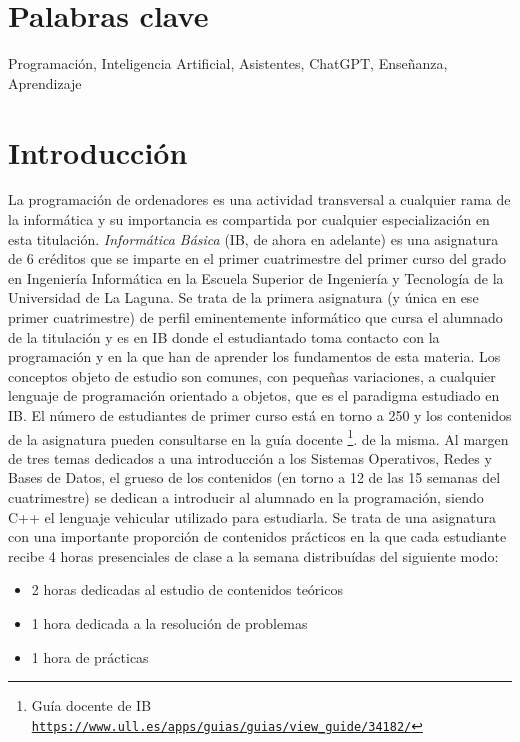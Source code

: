 \documentclass[twocolumn,twoside,a4paper, 10pt]{article}
\begin{document}
\section*{Palabras clave}
\noindent Programación, Inteligencia Artificial, Asistentes, ChatGPT, Enseñanza, Aprendizaje

\section{Introducción}
La programación de ordenadores es una actividad transversal a cualquier rama de la informática y su
importancia es compartida por cualquier especialización en esta titulación.
\textit{Informática Básica} 
(IB, de ahora en adelante) 
es una asignatura de 6 créditos que se imparte en el primer cuatrimestre 
del primer curso del grado en Ingeniería Informática en la Escuela Superior de Ingeniería y Tecnología de la Universidad de La Laguna.
Se trata de la primera asignatura (y única en ese primer cuatrimestre) de perfil eminentemente informático que
cursa el alumnado de la titulación y es en IB donde el estudiantado toma
contacto con la programación y en la que han de aprender los fundamentos de esta materia.
Los conceptos objeto de estudio son comunes, con pequeñas variaciones, a cualquier lenguaje de programación
orientado a objetos, que es el paradigma estudiado en IB.
El número de estudiantes de primer curso está en torno a 250 y los contenidos de la asignatura pueden 
consultarse en la guía docente
\footnote{Guía docente de IB\\ \href{https://www.ull.es/apps/guias/guias/view_guide/34182/}{\scriptsize{\texttt{https://www.ull.es/apps/guias/guias/view\_guide/34182/}}}}.
de la misma.
Al margen de tres temas dedicados a una introducción a los Sistemas Operativos, Redes y Bases de Datos,
el grueso de los contenidos (en torno a 12 de las 15 semanas del cuatrimestre) se dedican a introducir al
alumnado en la programación, siendo C++ el lenguaje vehicular utilizado para estudiarla.
Se trata de una asignatura con una importante proporción de contenidos prácticos en la que cada estudiante
recibe 4 horas presenciales de clase a la semana distribuídas del siguiente modo:
\begin{itemize}
  \item 2 horas dedicadas al estudio de contenidos teóricos
  \item 1 hora dedicada a la resolución de problemas
  \item 1 hora de prácticas
\end{itemize}
\end{document}
